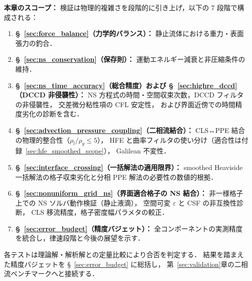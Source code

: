 \noindent\textbf{本章のスコープ：}
検証は物理的複雑さを段階的に引き上げ，以下の 7 段階で構成される：
\begin{enumerate}[noitemsep]
  \item \textbf{§~\ref{sec:force_balance}（力学的バランス）：}
        静止流体における重力・表面張力の釣合．
  \item \textbf{§~\ref{sec:ns_conservation}（保存則）：}
        運動エネルギー減衰と非圧縮条件の維持．
  \item \textbf{§~\ref{sec:ns_time_accuracy}（総合精度）および §~\ref{sec:highre_dccd}（DCCD 非侵襲性）：}
        NS 方程式の時間・空間収束次数，DCCD フィルタの非侵襲性，
        交差微分粘性項の CFL 安定性，
        および界面近傍での時間精度劣化の診断を含む．
  \item \textbf{§~\ref{sec:advection_pressure_coupling}（二相流結合）：}
        CLS↔PPE 結合の物理的整合性（$\rho_l/\rho_g \leq 5$），
        HFE と曲率フィルタの使い分け（適合性は付録~\ref{sec:hfe_smoothed_scope}），
        Galilean 不変性．
  \item \textbf{§~\ref{sec:interface_crossing}（一括解法の適用限界）：}
        smoothed Heaviside 一括解法の格子収束劣化と分相 PPE 解法の必要性の数値的根拠．
  \item \textbf{§~\ref{sec:nonuniform_grid_ns}（界面適合格子の NS 結合）：}
        非一様格子上での NS ソルバ動作検証（静止液滴），
        空間可変 $\varepsilon$ と CSF の非互換性診断，
        CLS 移流精度，格子密度幅パラメタの較正．
  \item \textbf{§~\ref{sec:error_budget}（精度バジェット）：}
        全コンポーネントの実測精度を統合し，律速段階と今後の展望を示す．
\end{enumerate}

\noindent
各テストは理論解・解析解との定量比較により合否を判定する．
結果を踏まえた精度バジェットを §~\ref{sec:error_budget} に総括し，
第~\ref{sec:validation}章の二相流ベンチマークへと接続する．

